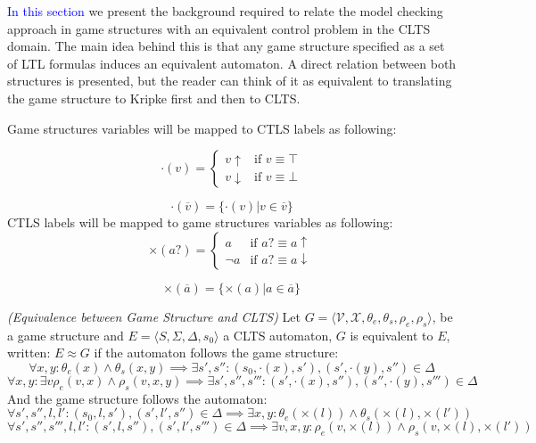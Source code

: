 \textcolor{blue}{In this section} we present the background required to relate the model checking approach in game structures with an equivalent control problem in the CLTS domain.  The main idea behind this is that any game structure specified as a set of LTL formulas induces an equivalent automaton. A direct relation between both structures is presented, but the reader can think of it as equivalent to translating the game structure to Kripke first and then to CLTS.

Game structures variables will be mapped to CTLS labels as following:

\[
\cdot(v) = \begin{cases}
v\uparrow & \text{if } v \equiv \top \\
v\downarrow & \text{if } v \equiv \bot
\end{cases}
\]

\[\cdot(\overline{v}) = \lbrace \cdot (v) | v \in \overline{v} \rbrace \]
CTLS labels will be mapped to game structures variables as following:
\[
\times (a?) = \begin{cases}
a & \text{if } a? \equiv a\uparrow \\
\neg a & \text{if } a? \equiv a\downarrow
\end{cases}
\]

\[\times(\overline{a}) = \lbrace \times (a) | a \in \overline{a} \rbrace \]

\begin{definition}
	\label{def:gs_clts_equivalence} \emph{(Equivalence between Game Structure and CLTS)} 
	Let $G=\langle \mathcal{V}, \mathcal{X}, \theta_{e}, \theta_{s}, \rho_{e}, \rho_{s}\rangle$, be a game structure and $E=\langle S, \Sigma, \Delta, s_{0}\rangle$ a CLTS automaton, $G$ is equivalent to $E$, written: $E \approx G$ if the automaton follows the game structure:
	\[
	\forall x, y: \theta_e(x) \wedge \theta_s(x,y) \implies \exists s',s'' : (s_0, \cdot (x), s'), (s', \cdot (y), s'') \in \Delta 
	\] 
	\[
	\forall x, y : \exists v \rho_e(v,x) \wedge \rho_s(v,x,y) \implies \exists s',s'',s''' : (s', \cdot (x), s''), (s'', \cdot (y), s''') \in \Delta 
	\] 
And the game structure follows the automaton:	
\[
\forall  s',s'',l,l' : (s_0, l, s'), (s', l', s'') \in \Delta  \implies \exists x,y: \theta_e(\times(l)) \wedge \theta_s(\times(l),\times(l'))
\] 
\[
\forall  s',s'',s''',l,l' : (s', l, s''), (s', l', s''') \in \Delta  \implies \exists v,x,y: \rho_e(v,\times(l)) \wedge \rho_s(v,\times(l),\times(l'))
\] 	%
\end{definition}

